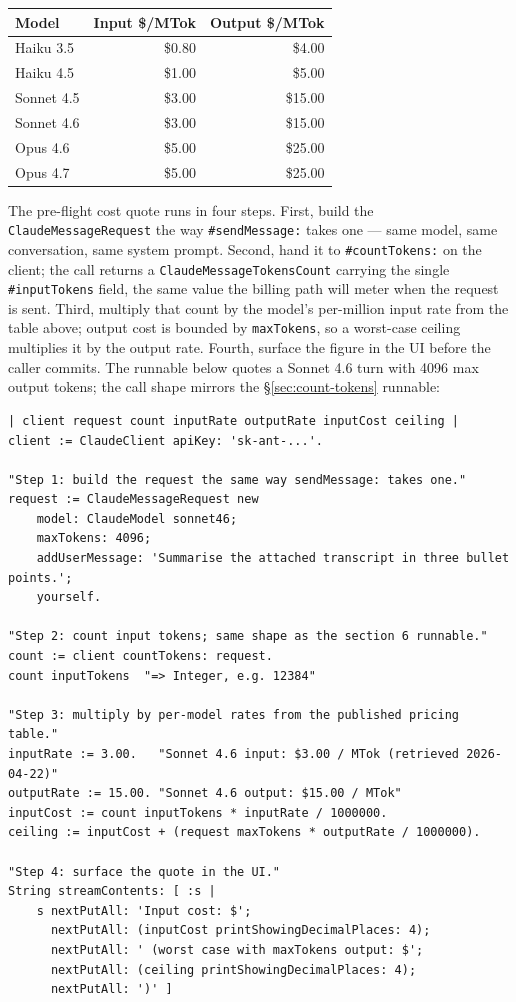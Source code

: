 \documentclass[a4paper,10pt,fleqn]{article}
\newcommand{\cls}[1]{\texttt{#1}}
\newcommand{\sel}[1]{\texttt{\##1}}
\begin{document}
\begin{center}
\small
\begin{tabular}{@{}lrr@{}}
\toprule
\textbf{Model} & \textbf{Input \$/MTok} & \textbf{Output \$/MTok} \\
\midrule
Haiku 3.5  & \$0.80 & \$4.00 \\
Haiku 4.5  & \$1.00 & \$5.00 \\
Sonnet 4.5 & \$3.00 & \$15.00 \\
Sonnet 4.6 & \$3.00 & \$15.00 \\
Opus 4.6   & \$5.00 & \$25.00 \\
Opus 4.7   & \$5.00 & \$25.00 \\
\bottomrule
\end{tabular}
\end{center}

The pre-flight cost quote runs in four steps.  First, build the
\cls{ClaudeMessageRequest} the way \sel{sendMessage:} takes one ---
same model, same conversation, same system prompt.  Second, hand it
to \sel{countTokens:} on the client; the call returns a
\cls{ClaudeMessageTokensCount} carrying the single
\sel{inputTokens} field, the same value the billing path will meter
when the request is sent.  Third, multiply that count by the model's
per-million input rate from the table above; output cost is bounded
by \texttt{maxTokens}, so a worst-case ceiling multiplies it by the
output rate.  Fourth, surface the figure in the UI before the
caller commits.  The runnable below quotes a Sonnet 4.6 turn with
4096 max output tokens; the call shape mirrors the
§\ref{sec:count-tokens} runnable:

\begin{lstlisting}[language={},title={Pre-flight cost quote}]
| client request count inputRate outputRate inputCost ceiling |
client := ClaudeClient apiKey: 'sk-ant-...'.

"Step 1: build the request the same way sendMessage: takes one."
request := ClaudeMessageRequest new
    model: ClaudeModel sonnet46;
    maxTokens: 4096;
    addUserMessage: 'Summarise the attached transcript in three bullet points.';
    yourself.

"Step 2: count input tokens; same shape as the section 6 runnable."
count := client countTokens: request.
count inputTokens  "=> Integer, e.g. 12384"

"Step 3: multiply by per-model rates from the published pricing table."
inputRate := 3.00.   "Sonnet 4.6 input: $3.00 / MTok (retrieved 2026-04-22)"
outputRate := 15.00. "Sonnet 4.6 output: $15.00 / MTok"
inputCost := count inputTokens * inputRate / 1000000.
ceiling := inputCost + (request maxTokens * outputRate / 1000000).

"Step 4: surface the quote in the UI."
String streamContents: [ :s |
    s nextPutAll: 'Input cost: $';
      nextPutAll: (inputCost printShowingDecimalPlaces: 4);
      nextPutAll: ' (worst case with maxTokens output: $';
      nextPutAll: (ceiling printShowingDecimalPlaces: 4);
      nextPutAll: ')' ]
\end{lstlisting}
\end{document}

